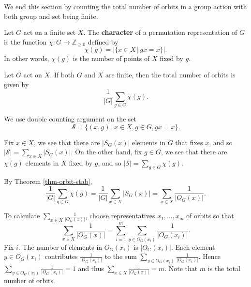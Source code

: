 \begin{remark}
We end this section by counting the total number of orbits in a group action with both group and set being finite.
\begin{definition}
	Let $G$ act on a finite set $X$. The \textbf{character} of a permutation representation of $G$ is the function $\chi:G\rightarrow \mathbb{Z}_{\geq 0}$ defined by
	\begin{equation*}
		\chi(g) = |\{x\in X\,|\, gx = x\}|.
	\end{equation*}
	In other words, $\chi(g)$ is the number of points of $X$ fixed by $g$.
\end{definition}
\begin{theorem} \label{thm-burnside-lemma}
	Let $G$ act on $X$. If both $G$ and $X$ are finite, then the total number of orbits is given by
	\begin{equation*}
		\frac{1}{|G|}\sum_{g\in G}\chi(g).
	\end{equation*}
\end{theorem}
\begin{sketch}
	We use double counting argument on the set 
	$$\mathcal{S} = \{(x,g)\,|\, x\in X,g\in G,gx = x\}.$$
	
	Fix $x\in X$, we see that there are $|S_G(x)|$ elements in $G$ that fixes $x$, and so $|\mathcal{S}| = \sum_{x\in X}|S_G(x)|$. On the other hand, fix $g\in G$, we see that there are $\chi(g)$ elements in $X$ fixed by $g$, and so 
	$|\mathcal{S}| = \sum_{g\in G}\chi(g)$.
	
	By Theorem \ref{thm-orbit-stab}, 
	\begin{equation*}
		\frac{1}{|G|} \sum_{g\in G}\chi(g) = \frac{1}{|G|} \sum_{x\in X}|S_G(x)| =  \sum_{x\in X} \frac{1}{|O_G(x)|}.
	\end{equation*}
	
To calculate $ \sum_{x\in X} \frac{1}{|O_G(x)|}$, choose representatives $x_1,\dots, x_m$ of orbits so that
\begin{equation*}
	\sum_{x\in X} \frac{1}{|O_G(x)|} = \sum_{i=1}^m\sum_{y\in O_G(x_i)} \frac{1}{|O_G(x_i)|}.
\end{equation*} Fix $i$. The number of elements in $O_G(x_i)$ is $|O_G(x_i)|$. Each element $y\in O_G(x_i)$ contributes $\frac{1}{|O_G(x_i)|}$ to the sum $\sum_{y\in O_G(x_i)} \frac{1}{|O_G(x_i)|}$. Hence $\sum_{y\in O_G(x_i)} \frac{1}{|O_G(x_i)|} = 1$ and thus $\sum_{x\in X} \frac{1}{|O_G(x)|} = m$. Note that $m$ is the total number of orbits.
\end{sketch}


\end{remark}

